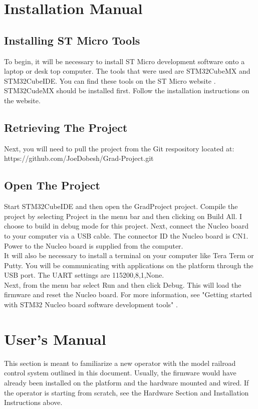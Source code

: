 \documentclass[acmlarge,screen]{acmart}
\begin{document}
\section{Installation Manual}
\subsection{Installing ST Micro Tools}
To begin, it will be necessary to install ST Micro development software onto a laptop or desk top computer. The tools that were used are STM32CubeMX and STM32CubeIDE. You can find these tools on the ST Micro website \cite{STMicro01}. STM32CudeMX should be installed first. Follow the installation instructions on the website.
\subsection{Retrieving The Project}
Next, you will need to pull the project from the Git respository located at:\\
 https://github.com/JoeDobesh/Grad-Project.git
\subsection{Open The Project}
Start STM32CubeIDE and then open the GradProject project. Compile the project by selecting Project in the menu bar and then clicking on Build All. I choose to build in debug mode for this project. Next, connect the Nucleo board to your computer via a USB cable. The connector ID the Nucleo board is CN1. Power to the Nucleo board is supplied from the computer.\\
It will also be necessary to install a terminal on your computer like Tera Term or Putty. You will be communicating with applications on the platform through the USB port. The UART settings are 115200,8,1,None.\\
Next, from the menu bar select Run and then click Debug. This will load the firmware and reset the Nucleo board. For more information, see "Getting started with STM32 Nucleo board software development tools" \cite{Nucleo01}.
\section{User's Manual}
This section is meant to familiarize a new operator with the model railroad control system outlined in this document. Usually, the firmware would have already been installed on the platform and the hardware mounted and wired. If the operator is starting from scratch, see the Hardware Section and Installation Instructions above.
\end{document}
